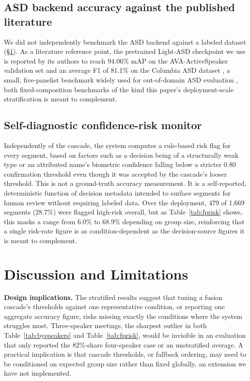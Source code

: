 \documentclass[conference,a4paper]{IEEEtran}
\begin{document}
\subsection{ASD backend accuracy against the published literature}
\label{sec:columbia}

We did not independently benchmark the ASD backend against a labeled
dataset (\S\ref{sec:limitations}). As a literature reference point, the
pretrained Light-ASD checkpoint we use is reported by its authors to
reach 94.06\% mAP on the AVA-ActiveSpeaker validation set and an
average F1 of 81.1\% on the Columbia ASD dataset
\cite{chakravarty2016columbia}, a small, five-panelist benchmark widely
used for out-of-domain ASD evaluation \cite{liao2023lightasd}, both
fixed-composition benchmarks of the kind this paper's deployment-scale
stratification is meant to complement.

\subsection{Self-diagnostic confidence-risk monitor}
\label{sec:fprisk}

Independently of the cascade, the system computes a rule-based risk
flag for every segment, based on factors such as a decision being of a
structurally weak type or an attributed name's biometric confidence
falling below a stricter 0.80 confirmation threshold even though it was
accepted by the cascade's looser threshold. This is not a ground-truth
accuracy measurement. It is a self-reported, deterministic function of
decision metadata intended to surface segments for human review without
requiring labeled data. Over the deployment, 479 of 1{,}669 segments
(28.7\%) were flagged high-risk overall, but as Table~\ref{tab:fprisk}
shows, this masks a range from 6.0\% to 68.9\% depending on group size,
reinforcing that a single risk-rate figure is as condition-dependent as
the decision-source figures it is meant to complement.

\section{Discussion and Limitations}
\label{sec:limitations}

\textbf{Design implications.} The stratified results suggest that
tuning a fusion cascade's thresholds against one representative
condition, or reporting one aggregate accuracy figure, risks missing
exactly the conditions where the system struggles most. Three-speaker
meetings, the sharpest outlier in both Table~\ref{tab:byspeakers} and
Table~\ref{tab:fprisk}, would be invisible in an evaluation that only
reported the 82\%-share four-speaker case or an unstratified average.
A practical implication is that cascade thresholds, or fallback
ordering, may need to be conditioned on expected group size rather than
fixed globally, an extension we have not implemented.
\end{document}
